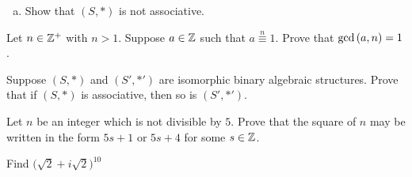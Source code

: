 \documentclass[11pt]{exam}
\begin{document}
\begin{questions}
\begin{enumerate}[(a)]
\item Show that $(S,*)$ is not associative.
\vspace{5cm}
\end{enumerate}
\newpage

\question[4] Let $n\in\mathbb{Z}^{+}$ with $n > 1$.  Suppose $a\in\mathbb{Z}$ such that $a\overset{n}{\equiv} 1$.  Prove that $\text{gcd}\left(a,n\right) = 1$.
\vfill

\question[4] Suppose $(S,*)$ and $(S',*')$ are isomorphic binary algebraic structures.  Prove that if $(S,*)$ is associative, then so is $(S',*')$.
\vfill
\newpage

\question[4] Let $n$ be an integer which is not divisible by $5$.  Prove that the square of $n$ may be written in the form $5s+1$ or $5s + 4$ for some $s\in\mathbb{Z}$.
\vfill

\question[3] Find $\big(\sqrt{2} + i\sqrt{2}\big)^{10}$
\vfill

\end{questions}
\end{document}
